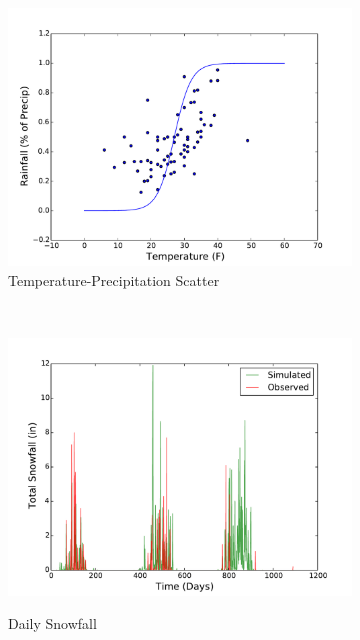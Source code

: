 \documentclass[11pt, letterpaper]{article}
\begin{document}
\begin{figure}[H]
\begin{subfigure}[b]{0.45\textwidth}
    \includegraphics[width=\textwidth]{figures/daily_temp_precip_scatter.pdf}
    \caption{Temperature-Precipitation Scatter}
  \end{subfigure}
  ~
  \begin{subfigure}[b]{0.45\textwidth}
    \includegraphics[width=\textwidth]{figures/daily_snowfall.pdf}
    \label{fig:analysis-raw}
    \caption{Daily Snowfall}
  \end{subfigure}
  ~
  \begin{subfigure}[b]{0.45\textwidth}

\end{subfigure}
\end{figure}
\end{document}
